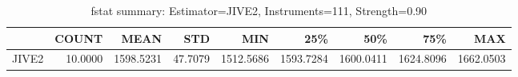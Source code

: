 \begin{table}[ht]
\centering
\caption{fstat summary: Estimator=JIVE2, Instruments=111, Strength=0.90}
\begin{tabular}{lrrrrrrrr}
\toprule
 & COUNT & MEAN & STD & MIN & 25\% & 50\% & 75\% & MAX \\
\midrule
JIVE2 & 10.0000 & 1598.5231 & 47.7079 & 1512.5686 & 1593.7284 & 1600.0411 & 1624.8096 & 1662.0503 \\
\bottomrule
\end{tabular}
\end{table}
